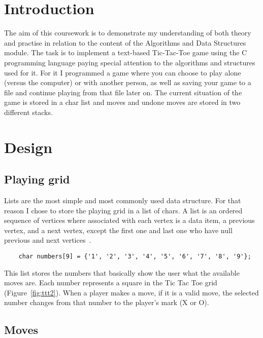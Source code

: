 \documentclass[10pt, a4paper]{article}
\title{\mytitle}
\author{\myauthor\hspace{1em}\\\contact\\Edinburgh Napier University\hspace{0.5em}-\hspace{0.5em}\mymodule}
\date{}
\begin{document}
    \maketitle

    \section{Introduction}

The aim of this coursework is to demonstrate my understanding of both theory and practise in relation to the content of the Algorithms and Data Structures module. The task is to implement a text-based Tic-Tac-Toe game using the C programming language paying special attention to the algorithms and structures used for it. For it I programmed a game where you can choose to play alone (versus the computer) or with another person, as well as saving your game to a file and continue playing from that file later on. The current situation of the game is stored in a char list and  moves and undone moves are stored in two different stacks.

	\section{Design}

    \subsection{Playing grid}

Lists are the most simple and most commonly used data structure. For that reason I chose to store the playing grid in a list of chars. A list is an ordered sequence of vertices where associated with each vertex is a data item, a previous vertex, and a next vertex, except the first one and last one who have null previous and next vertices~\cite{storer_2013}.

\begin{lstlisting}
    char numbers[9] = {'1', '2', '3', '4', '5', '6', '7', '8', '9'};
\end{lstlisting}

This list stores the numbers that basically show the user what the available moves are. Each number represents a square in the Tic Tac Toe grid (Figure~\ref{fig:ttt2}). When a player makes a move, if it is a valid move, the selected number changes from that number to the player's mark (X or O).

    \subsection{Moves}
\end{document}
